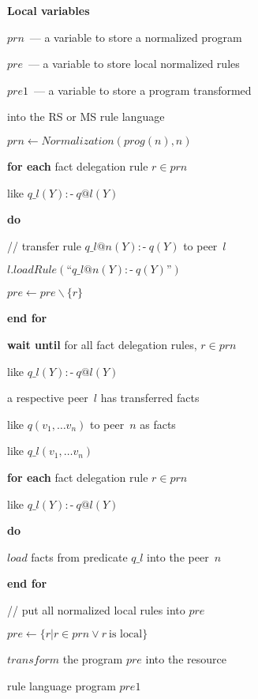\begin{multicols}{2}
\noindent
\textbf{Local variables}

$prn$~--- a variable to store a normalized program

$pre$~--- a variable to store local normalized rules

$pre1$~--- a variable to store a program transformed 

\hspace*{5mm}into the RS or MS rule language

\noindent
 $prn \leftarrow Normalization(prog(n), n)$

  \noindent
  \textbf{for each} fact delegation rule $r\in prn$ 
  
  like $q\_l(Y):\!\mbox{-}\ q@l(Y)$
  
  \noindent 
  \textbf{do}

// transfer rule $q\_l@n(Y):\!\mbox{-}\ q(Y)$ to peer~$l$

$l.loadRule(\mbox{``}q\_l@n(Y):\!\mbox{-}\ q(Y)\mbox{''})$

$pre \leftarrow  pre \backslash \{ r \}$

\noindent
  \textbf{end for}

 \noindent
  \textbf{wait until} for all fact delegation rules, $r\in  prn$ 
  
  \hspace*{4mm}like $q\_l(Y):\!\mbox{-}\ q@l(Y)$

\hspace*{4mm}a respective peer~$l$ has transferred facts

\hspace*{4mm}like $q(v_1, \ldots v_n)$ to peer~$n$ as facts 

\hspace*{4mm}like  $q\_l(v_1, \ldots v_n)$ 

  \noindent
  \textbf{for each} fact delegation rule $r \in prn$ 
  
like $q\_l(Y):\!\mbox{-}\ q@l(Y)$
  
  \noindent
  \textbf{do}

$load$ facts from predicate $q\_l$ into the peer~$n$

  \noindent
  \textbf{end for}

  \noindent
  // put all normalized local rules into $pre$

  \noindent
  $pre \leftarrow \{ r \vert r \in  prn \vee r\ \mbox{is local} \}$

  \noindent
  $transform$ the program $pre$ into the resource
  
  rule language program $pre1$


\end{multicols}
